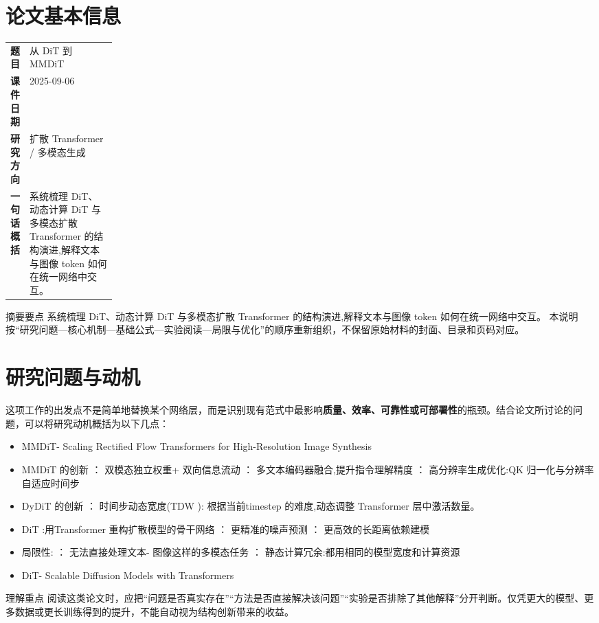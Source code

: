 \documentclass[UTF8,11pt,a4paper]{ctexart}
\newcommand{\term}[1]{\textbf{\textcolor{mainblue}{#1}}}
\begin{document}
\section{论文基本信息}
\begin{center}
\begin{tabularx}{0.94\linewidth}{>{\bfseries}p{0.18\linewidth}X}
\toprule
题目 & 从 DiT 到 MMDiT\\
课件日期 & 2025-09-06\\
研究方向 & 扩散 Transformer / 多模态生成\\
一句话概括 & 系统梳理 DiT、动态计算 DiT 与多模态扩散 Transformer 的结构演进,解释文本与图像 token 如何在统一网络中交互。\\
\bottomrule
\end{tabularx}
\end{center}

\begin{infobox}{摘要要点}
系统梳理 DiT、动态计算 DiT 与多模态扩散 Transformer 的结构演进,解释文本与图像 token 如何在统一网络中交互。 本说明按“研究问题—核心机制—基础公式—实验阅读—局限与优化”的顺序重新组织，不保留原始材料的封面、目录和页码对应。
\end{infobox}

\section{研究问题与动机}
这项工作的出发点不是简单地替换某个网络层，而是识别现有范式中最影响\term{质量、效率、可靠性或可部署性}的瓶颈。结合论文所讨论的问题，可以将研究动机概括为以下几点：
\begin{itemize}
\item MMDiT- Scaling Rectified Flow Transformers for High-Resolution Image Synthesis
\item MMDiT 的创新 ： 双模态独立权重+ 双向信息流动 ： 多文本编码器融合,提升指令理解精度 ： 高分辨率生成优化:QK 归一化与分辨率自适应时间步
\item DyDiT 的创新 ： 时间步动态宽度(TDW ): 根据当前timestep 的难度,动态调整 Transformer 层中激活数量。
\item DiT :用Transformer 重构扩散模型的骨干网络 ： 更精准的噪声预测 ： 更高效的长距离依赖建模
\item 局限性: ： 无法直接处理文本- 图像这样的多模态任务 ： 静态计算冗余:都用相同的模型宽度和计算资源
\item DiT- Scalable Diffusion Models with Transformers
\end{itemize}

\begin{notebox}{理解重点}
阅读这类论文时，应把“问题是否真实存在”“方法是否直接解决该问题”“实验是否排除了其他解释”分开判断。仅凭更大的模型、更多数据或更长训练得到的提升，不能自动视为结构创新带来的收益。
\end{notebox}
\end{document}
